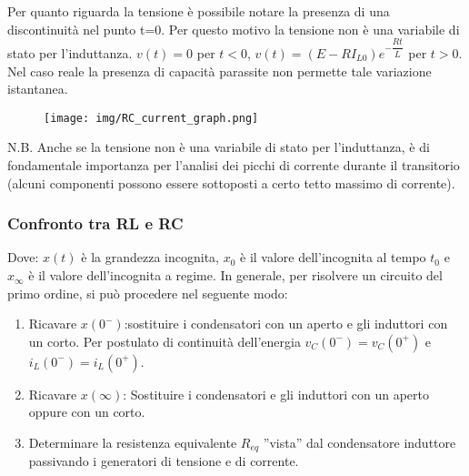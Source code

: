 \documentclass{article}
\begin{document}
\noindent Per quanto riguarda la tensione è possibile notare la presenza di una discontinuità nel punto t=0. Per questo motivo la tensione non è
una variabile di stato per l'induttanza. $v(t)=0$ per $t<0$, $v(t)=(E-RI_{L0})e^{-\dfrac{Rt}{L}}$ per $t>0$.
Nel caso reale la presenza di capacità parassite non permette tale variazione istantanea.
\begin{figure}[h!]
    \begin{center}
        \texttt{[image: img/RC\_current\_graph.png]}
    \end{center}
\end{figure}

\noindent N.B. Anche se la tensione non è una variabile di stato per l'induttanza, è di fondamentale importanza per l'analisi dei picchi di corrente
durante il transitorio (alcuni componenti possono essere sottoposti a certo tetto massimo di corrente).

\subsubsection{Confronto tra RL e RC}

\medskip
\noindent{}
\medskip

\noindent Dove: $x(t)$ è la grandezza incognita, $x_0$ è il valore dell'incognita al tempo $t_0$ e $x_\infty$ è il valore
dell'incognita a regime. In generale, per risolvere un circuito del primo ordine, si può procedere nel seguente modo:

\begin{enumerate}
    \item Ricavare $x(0^-)$:sostituire i condensatori con un aperto e gli induttori con un corto. Per postulato di continuità dell'energia
     $v_{C}(0^-)=v_{C}(0^+)$ e $i_{L}(0^-)=i_{L}(0^+)$.
    \item Ricavare $x(\infty)$: Sostituire i condensatori e gli induttori con un aperto oppure con un corto.
    \item Determinare la resistenza equivalente $R_{eq}$ ”vista” dal condensatore induttore passivando i generatori di tensione e di corrente.
\end{enumerate}
\end{document}
